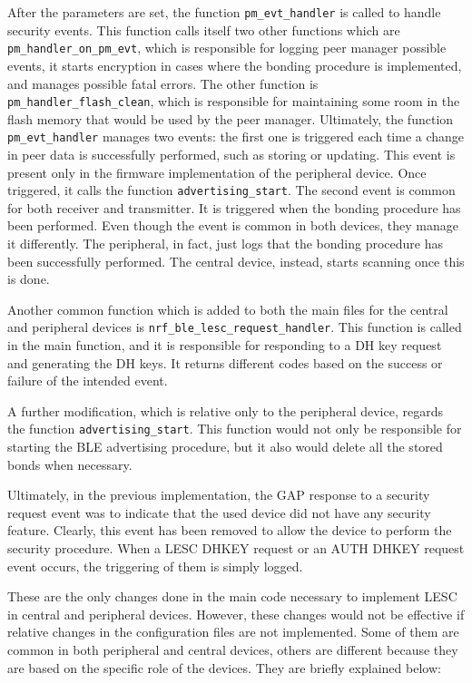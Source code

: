 \documentclass{Configuration_Files/PoliMi3i_thesis}
\begin{document}
After the parameters are set, the function \texttt{pm\_evt\_handler} is called to handle security events. This function calls itself two other functions which are \texttt{pm\_handler\_on\_pm\_evt}, which is responsible for logging peer manager possible events, it starts encryption in cases where the bonding procedure is implemented, and manages possible fatal errors. The other function is \texttt{pm\_handler\_flash\_clean}, which is responsible for maintaining some room in the flash memory that would be used by the peer manager. Ultimately, the function \texttt{pm\_evt\_handler} manages two events: the first one is triggered each time a change in peer data is successfully performed, such as storing or updating. This event is present only in the firmware implementation of the peripheral device. Once triggered, it calls the function \texttt{advertising\_start}. The second event is common for both receiver and transmitter. It is triggered when the bonding procedure has been performed. Even though the event is common in both devices, they manage it differently. The peripheral, in fact, just logs that the bonding procedure has been successfully performed. The central device, instead, starts scanning once this is done.

Another common function which is added to both the main files for the central and peripheral devices is \texttt{nrf\_ble\_lesc\_request\_handler}. This function is called in the main function, and it is responsible for responding to a DH key request and generating the DH keys. It returns different codes based on the success or failure of the intended event.

A further modification, which is relative only to the peripheral device, regards the function \texttt{advertising\_start}. This function would not only be responsible for starting the BLE advertising procedure, but it also would delete all the stored bonds when necessary.

Ultimately, in the previous implementation, the GAP response to a security request event was to indicate that the used device did not have any security feature. Clearly, this event has been removed to allow the device to perform the security procedure. When a LESC DHKEY request or an AUTH DHKEY request event occurs, the triggering of them is simply logged.

These are the only changes done in the main code necessary to implement LESC in central and peripheral devices. However, these changes would not be effective if relative changes in the configuration files are not implemented. Some of them are common in both peripheral and central devices, others are different because they are based on the specific role of the devices. They are briefly explained below:
\end{document}
